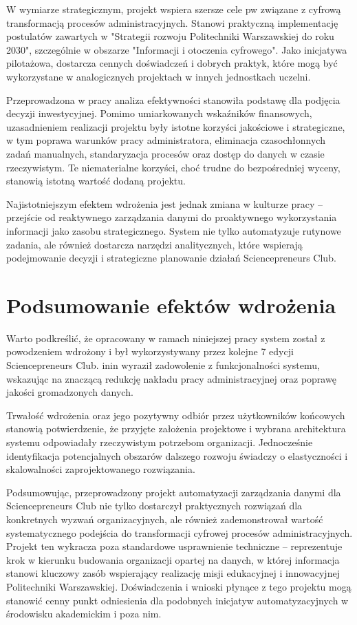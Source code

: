 W wymiarze strategicznym, projekt wspiera szersze cele \gls{pw} związane z cyfrową transformacją procesów administracyjnych. Stanowi praktyczną implementację postulatów zawartych w "Strategii rozwoju Politechniki Warszawskiej do roku 2030"\cite{PW2030}, szczególnie w obszarze "Informacji i otoczenia cyfrowego". Jako inicjatywa pilotażowa, dostarcza cennych doświadczeń i dobrych praktyk, które mogą być wykorzystane w analogicznych projektach w innych jednostkach uczelni.

Przeprowadzona w pracy analiza efektywności stanowiła podstawę dla podjęcia decyzji inwestycyjnej. Pomimo umiarkowanych wskaźników finansowych, uzasadnieniem realizacji projektu były istotne korzyści jakościowe i strategiczne, w tym poprawa warunków pracy administratora, eliminacja czasochłonnych zadań manualnych, standaryzacja procesów oraz dostęp do danych w czasie rzeczywistym. Te niematerialne korzyści, choć trudne do bezpośredniej wyceny, stanowią istotną wartość dodaną projektu.

Najistotniejszym efektem wdrożenia jest jednak zmiana w kulturze pracy – przejście od reaktywnego zarządzania danymi do proaktywnego wykorzystania informacji jako zasobu strategicznego. System nie tylko automatyzuje rutynowe zadania, ale również dostarcza narzędzi analitycznych, które wspierają podejmowanie decyzji i strategiczne planowanie działań Sciencepreneurs Club.

\section{Podsumowanie efektów wdrożenia}
Warto podkreślić, że opracowany w ramach niniejszej pracy system został z powodzeniem wdrożony i był wykorzystywany przez kolejne 7 edycji Sciencepreneurs Club. \gls{inin} wyraził zadowolenie z funkcjonalności systemu, wskazując na znaczącą redukcję nakładu pracy administracyjnej oraz poprawę jakości gromadzonych danych.

Trwałość wdrożenia oraz jego pozytywny odbiór przez użytkowników końcowych stanowią potwierdzenie, że przyjęte założenia projektowe i wybrana architektura systemu odpowiadały rzeczywistym potrzebom organizacji. Jednocześnie identyfikacja potencjalnych obszarów dalszego rozwoju świadczy o elastyczności i skalowalności zaprojektowanego rozwiązania.

Podsumowując, przeprowadzony projekt automatyzacji zarządzania danymi dla Sciencepreneurs Club nie tylko dostarczył praktycznych rozwiązań dla konkretnych wyzwań organizacyjnych, ale również zademonstrował wartość systematycznego podejścia do transformacji cyfrowej procesów administracyjnych. Projekt ten wykracza poza standardowe usprawnienie techniczne – reprezentuje krok w kierunku budowania organizacji opartej na danych, w której informacja stanowi kluczowy zasób wspierający realizację misji edukacyjnej i innowacyjnej Politechniki Warszawskiej. Doświadczenia i wnioski płynące z tego projektu mogą stanowić cenny punkt odniesienia dla podobnych inicjatyw automatyzacyjnych w środowisku akademickim i poza nim. 

